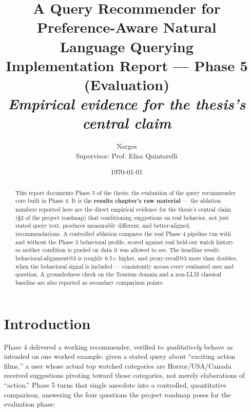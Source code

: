 \documentclass[11pt,a4paper]{article}
\title{\Large \textbf{A Query Recommender for Preference-Aware Natural Language Querying} \\[4pt]
\large Implementation Report --- Phase 5 (Evaluation) \\[2pt]
\normalsize \emph{Empirical evidence for the thesis's central claim}}
\author{Narges \\ \small Supervisor: Prof. Elisa Quintarelli}
\date{\today}
\begin{document}
\maketitle

\begin{abstract}
\noindent
This report documents Phase 5 of the thesis: the evaluation of the query recommender core built in
Phase 4. It is the \textbf{results chapter's raw material} --- the ablation numbers reported here
are the direct empirical evidence for the thesis's central claim (\S2 of the project roadmap) that
conditioning suggestions on real behavior, not just stated query text, produces measurably
different, and better-aligned, recommendations. A controlled ablation compares the real Phase 4
pipeline run with and without the Phase 3 behavioral profile, scored against real held-out watch
history so neither condition is graded on data it was allowed to see. The headline result:
behavioral-alignment@3 is roughly 6.5$\times$ higher, and proxy-recall@3 more than doubles, when the
behavioral signal is included --- consistently across every evaluated user and question. A
groundedness check on the Tourism domain and a non-LLM classical baseline are also reported as
secondary comparison points.
\end{abstract}

\tableofcontents
\newpage

\section{Introduction}

Phase 4 delivered a working recommender, verified to \emph{qualitatively} behave as intended on one
worked example: given a stated query about ``exciting action films,'' a user whose actual top
watched categories are Horror/USA/Canada received suggestions pivoting toward those categories, not
merely elaborations of ``action.'' Phase 5 turns that single anecdote into a controlled,
quantitative comparison, answering the four questions the project roadmap poses for the evaluation
phase:
\end{document}
